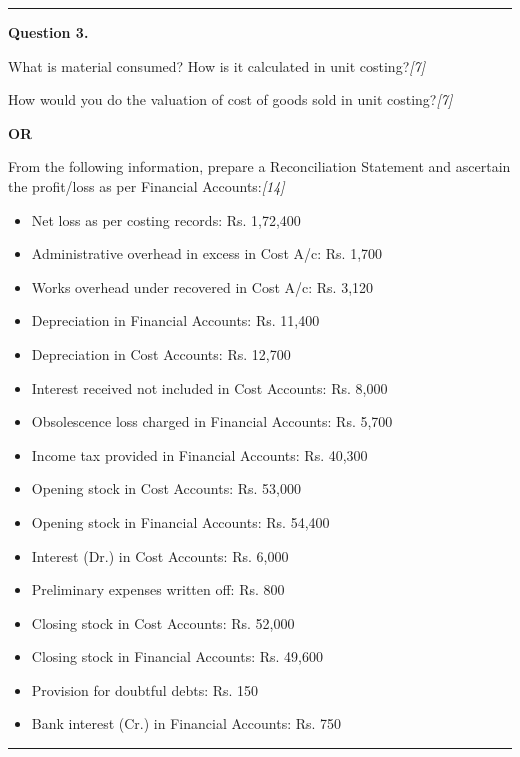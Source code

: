 \documentclass[11pt,a4paper]{article}
\newcommand{\pts}[1]{\hfill   \textit{[#1]}}
\begin{document}
\medskip\rule{\linewidth}{0.2pt}




\noindent   \textbf{Question 3.} \\

\begin{parts}
  \item What is material consumed? How is it calculated in unit costing?\pts{7}
  \item How would you do the valuation of cost of goods sold in unit costing?\pts{7}
\end{parts}

\centerline{   \textbf{OR}}

From the following information, prepare a Reconciliation Statement and ascertain the profit/loss as per Financial Accounts:\pts{14}

\begin{itemize}[itemsep=2pt,topsep=2pt]
  \item Net loss as per costing records: Rs. 1,72,400
  \item Administrative overhead in excess in Cost A/c: Rs. 1,700
  \item Works overhead under recovered in Cost A/c: Rs. 3,120
  \item Depreciation in Financial Accounts: Rs. 11,400
  \item Depreciation in Cost Accounts: Rs. 12,700
  \item Interest received not included in Cost Accounts: Rs. 8,000
  \item Obsolescence loss charged in Financial Accounts: Rs. 5,700
  \item Income tax provided in Financial Accounts: Rs. 40,300
  \item Opening stock in Cost Accounts: Rs. 53,000
  \item Opening stock in Financial Accounts: Rs. 54,400
  \item Interest (Dr.) in Cost Accounts: Rs. 6,000
  \item Preliminary expenses written off: Rs. 800
  \item Closing stock in Cost Accounts: Rs. 52,000
  \item Closing stock in Financial Accounts: Rs. 49,600
  \item Provision for doubtful debts: Rs. 150
  \item Bank interest (Cr.) in Financial Accounts: Rs. 750
\end{itemize}

\medskip\rule{\linewidth}{0.2pt}
\end{document}

